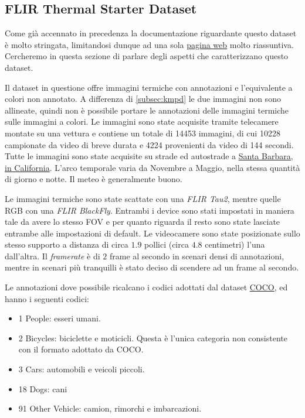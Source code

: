 \subsection{FLIR Thermal Starter Dataset}
\label{subsec:flirdataset}
Come già accennato in precedenza la documentazione riguardante questo dataset è molto stringata, limitandosi dunque ad una sola \href{https://www.flir.com/oem/adas/adas-dataset-form/}{pagina web} molto riassuntiva. Cercheremo in questa sezione di parlare degli aspetti che caratterizzano questo dataset.

Il dataset in questione offre immagini termiche con annotazioni e l'equivalente a colori non annotato. A differenza di \ref{subsec:kmpd} le due immagini non sono allineate, quindi non è possibile portare le annotazioni delle immagini termiche sulle immagini a colori.
Le immagini sono state acquisite tramite telecamere montate su una vettura e contiene un totale di 14453 immagini, di cui 10228 campionate da video di breve durata e 4224 provenienti da video di 144 secondi.
Tutte le immagini sono state acquisite su strade ed autostrade a \href{https://goo.gl/maps/wFDVoozpdnJ7hfrd7}{Santa Barbara, in California}. L'arco temporale varia da Novembre a Maggio, nella stessa quantità di giorno e notte. Il meteo è generalmente buono.

Le immagini termiche sono state scattate con una \textit{FLIR Tau2}, mentre quelle RGB con una \textit{FLIR BlackFly}. Entrambi i device sono stati impostati in maniera tale da avere lo stesso \ac{FOV} e per quanto riguarda il resto sono state lasciate entrambe alle impostazioni di default. 
Le videocamere sono state posizionate sullo stesso supporto a distanza di circa $1.9$ pollici (circa $4.8$ centimetri) l'una dall'altra. Il \textit{framerate} è di $2$ frame al secondo in scenari densi di annotazioni, mentre in scenari più tranquilli è stato deciso di scendere ad un frame al secondo.

Le annotazioni dove possibile ricalcano i codici adottati dal dataset \href{http://cocodataset.org/}{COCO}, ed hanno i seguenti codici:
\begin{itemize}
    \item 1 People: esseri umani.
    \item 2 Bicycles: biciclette e moticicli. Questa è l'unica categoria non consistente con il formato adottato da COCO.
    \item 3 Cars: automobili e veicoli piccoli.
    \item 18 Dogs: cani 
    \item 91 Other Vehicle: camion, rimorchi e imbarcazioni.
\end{itemize}

